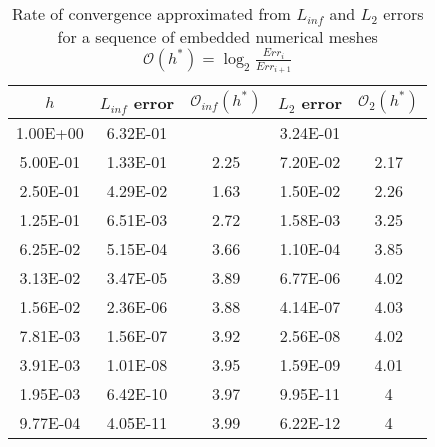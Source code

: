 	 \begin{table}
		\centering\footnotesize
		\begin{tabular}{ccccc}
			\hline
			$h$ & $L_{inf}$ error &  $\mathcal{O}_{inf} (h^*)$ &  $L_2$ error  & $\mathcal{O}_2 (h^*)$ \\
			\hline
1.00E+00	&	6.32E-01	&		&	3.24E-01	&		\\
5.00E-01	&	1.33E-01	&	2.25	&	7.20E-02	&	2.17	\\
2.50E-01	&	4.29E-02	&	1.63	&	1.50E-02	&	2.26	\\
1.25E-01	&	6.51E-03	&	2.72	&	1.58E-03	&	3.25	\\
6.25E-02	&	5.15E-04	&	3.66	&	1.10E-04	&	3.85	\\
3.13E-02	&	3.47E-05	&	3.89	&	6.77E-06	&	4.02	\\
1.56E-02	&	2.36E-06	&	3.88	&	4.14E-07	&	4.03	\\
7.81E-03	&	1.56E-07	&	3.92	&	2.56E-08	&	4.02	\\
3.91E-03	&	1.01E-08	&	3.95	&	1.59E-09	&	4.01	\\
1.95E-03	&	6.42E-10	&	3.97	&	9.95E-11	&	4	\\
9.77E-04	&	4.05E-11	&	3.99	&	6.22E-12	&	4	\\
			\hline			
		\end{tabular}
		\caption{Rate of convergence approximated from $L_{inf}$ and $L_2$ errors for a sequence of embedded numerical meshes $\mathcal{O}(h^*)=\log_2 \frac{Err_i}{Err_{i+1}}$}
		\label{tab:convergence}
	\end{table}

